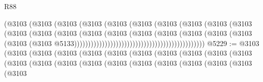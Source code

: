 \begin{lexlean}{R88}
\begin{coremodule}
                                                      (@3103
                                                        (@3103
                                                          (@3103
                                                            (@3103
                                                              (@3103
                                                                (@3103
                                                                  (@3103
                                                                    (@3103
                                                                      (@3103
                                                                        (@3103
                                                                          (@3103
                                                                            (@3103
                                                                              (@3103
                                                                                (@3103
                                                                                  (@3103
                                                                                    (@3103
                                                                                      (@3103
                                                                                        (@3103
                                                                                          (@3103
                                                                                            (@3103
                                                                                              (@3103
                                                                                                (@3103
                                                                                                  @5133)))))))))))))))))))))))))))))))))))))))))))))))
@5229 := @3103
    (@3103
      (@3103
        (@3103
          (@3103
            (@3103
              (@3103
                (@3103
                  (@3103
                    (@3103
                      (@3103
                        (@3103
                          (@3103
                            (@3103
                              (@3103
                                (@3103
                                  (@3103
                                    (@3103
                                      (@3103
                                        (@3103
                                          (@3103
                                            (@3103

\end{coremodule}
\end{lexlean}
